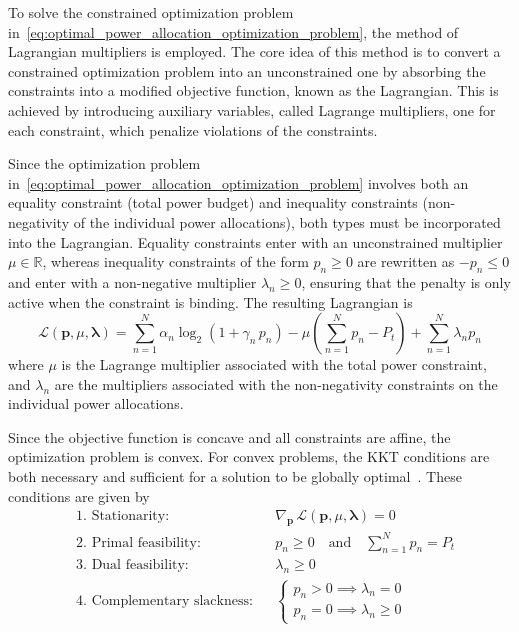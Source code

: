 To solve the constrained optimization problem in~\eqref{eq:optimal_power_allocation_optimization_problem}, the method of Lagrangian multipliers is employed.
The core idea of this method is to convert a constrained optimization problem into an unconstrained one by absorbing the constraints into a modified objective function, known as the Lagrangian.
This is achieved by introducing auxiliary variables, called Lagrange multipliers, one for each constraint, which penalize violations of the constraints.

Since the optimization problem in~\eqref{eq:optimal_power_allocation_optimization_problem} involves both an equality constraint (total power budget) and inequality constraints (non-negativity of the individual power allocations), both types must be incorporated into the Lagrangian.
Equality constraints enter with an unconstrained multiplier $\mu \in \mathbb{R}$, whereas inequality constraints of the form $p_n \geq 0$ are rewritten as $-p_n \leq 0$ and enter with a non-negative multiplier $\lambda_n \geq 0$, ensuring that the penalty is only active when the constraint is binding.
The resulting Lagrangian is
\begin{equation}
    \mathcal{L}(\mathbf{p}, \mu, \boldsymbol{\lambda}) = \sum_{n=1}^{N} \alpha_n \log_2 \left( 1 + \gamma_n \, p_n \right) - \mu \left(\sum_{n=1}^{N} p_n - P_t \right) + \sum_{n=1}^{N} \lambda_n p_n
\end{equation}
where $\mu$ is the Lagrange multiplier associated with the total power constraint, and $\lambda_n$ are the multipliers associated with the non-negativity constraints on the individual power allocations.

Since the objective function is concave and all constraints are affine, the optimization problem is convex.
For convex problems, the \acf{KKT} conditions are both necessary and sufficient for a solution to be globally optimal~\cite{convex_optimization_2004, KKT_conditions_2009}.
These conditions are given by
\begin{subequations}
\label{eq:KKT_conditions}
\begin{align}
    & \text{1. Stationarity:}               && \nabla_{\mathbf{p}} \, \mathcal{L}(\mathbf{p}, \mu, \boldsymbol{\lambda}) = 0 \\
    & \text{2. Primal feasibility:}         && p_n \geq 0  \quad \text{and} \quad \sum_{n=1}^{N} p_n = P_t \\
    & \text{3. Dual feasibility:}           && \lambda_n \geq 0 \\
    & \text{4. Complementary slackness:}    && \begin{cases} p_n > 0 \implies \lambda_n = 0 \\ p_n = 0 \implies \lambda_n \geq 0 \end{cases}
\end{align}
\end{subequations}

